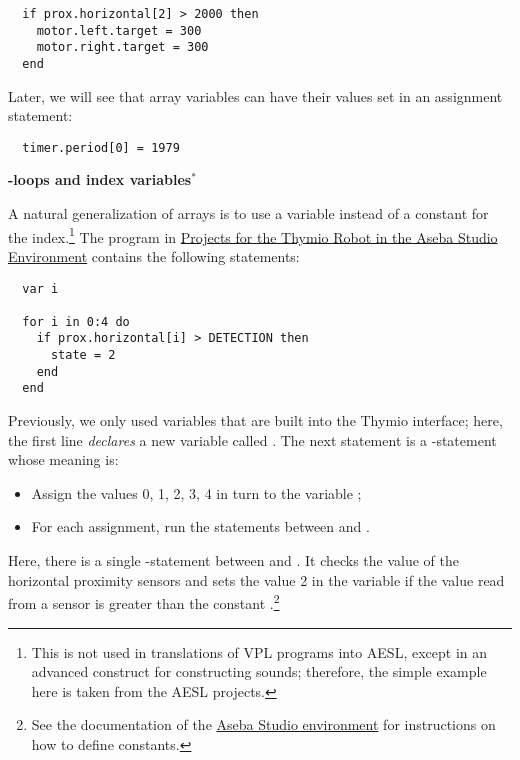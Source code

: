 \begin{footnotesize}
\begin{verbatim}
  if prox.horizontal[2] > 2000 then
    motor.left.target = 300
    motor.right.target = 300
  end
\end{verbatim}
\end{footnotesize}

Later, we will see that array variables can have their
values set in an assignment statement:
\begin{footnotesize}
\begin{verbatim}
  timer.period[0] = 1979
\end{verbatim}
\end{footnotesize}

\textbf{\large {}-loops and index variables$^*$}

A natural generalization of arrays is to use a variable instead of a
constant for the index.\footnote{This is not used in translations of VPL
programs into AESL, except in an advanced construct for constructing
sounds; therefore, the simple example here is taken from the AESL
projects.} The program  in
\href{https://aseba.wdfiles.com/local--files/en:thymioprogram/thymio-programming-exercises-en.zip}%
{Projects for the Thymio Robot in the Aseba Studio Environment} contains
the following statements:

\begin{footnotesize}
\begin{verbatim}
  var i

  for i in 0:4 do
    if prox.horizontal[i] > DETECTION then
      state = 2
    end
  end
\end{verbatim}
\end{footnotesize}

Previously, we only used variables that are built into the Thymio
interface; here, the first line \emph{declares} a new variable called
. The next statement is a -statement whose meaning is:

\begin{itemize}
\item Assign the values 0, 1, 2, 3, 4 in turn to the variable ;
\item For each assignment, run the statements between  and .
\end{itemize}

Here, there is a single -statement between  and . It
checks the value of the horizontal proximity sensors and sets the value
2 in the variable  if the value read from a sensor is greater
than the constant .\footnote{See the documentation of the 
\href{https://aseba.wikidot.com/en:asebastudio}{Aseba Studio environment}
for instructions on how to define constants.}

